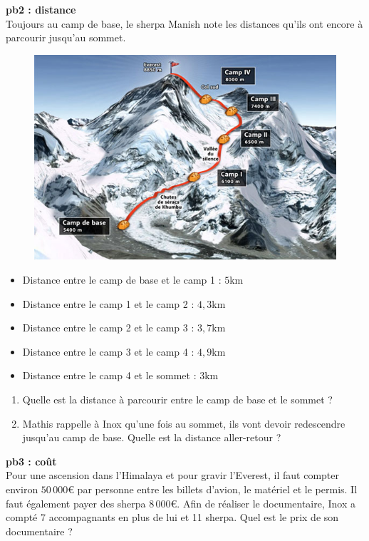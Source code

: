 \textbf{pb2 : distance} \\
 
Toujours au camp de base, le sherpa Manish note les distances qu'ils ont encore à parcourir jusqu'au sommet. 

\begin{multicols}{2}

\begin{figure}[H]
  \centering
  \includegraphics[width=0.8\linewidth]{5x1-calcul-numerique/camp.jpg}
\end{figure} \columnbreak

\begin{itemize}[label={$\bullet$}]
  \item Distance entre le camp de base et le camp 1 : $5$km \\
  \item Distance entre le camp 1 et le camp 2 : $4,3$km \\
  \item Distance entre le camp 2 et le camp 3 : $3,7$km \\
  \item Distance entre le camp 3 et le camp 4 : $4,9$km \\
  \item Distance entre le camp 4 et le sommet : $3$km \\
\end{itemize} 

\end{multicols}

\begin{enumerate}
  \item[1.] Quelle est la distance à parcourir entre le camp de base et le sommet ?
  \item[2.] Mathis rappelle à Inox qu'une fois au sommet, ils vont devoir redescendre jusqu'au camp de base. Quelle est la distance aller-retour ? \\
\end{enumerate}

\textbf{pb3 : coût} \\

Pour une ascension dans l’Himalaya et pour gravir l’Everest, il faut compter environ $50\,000$€ par personne entre les billets d'avion, le matériel et le permis. Il faut également payer des sherpa $8\,000$€. Afin de réaliser le documentaire, Inox a compté 7 accompagnants en plus de lui et 11 sherpa. Quel est le prix de son documentaire ?


